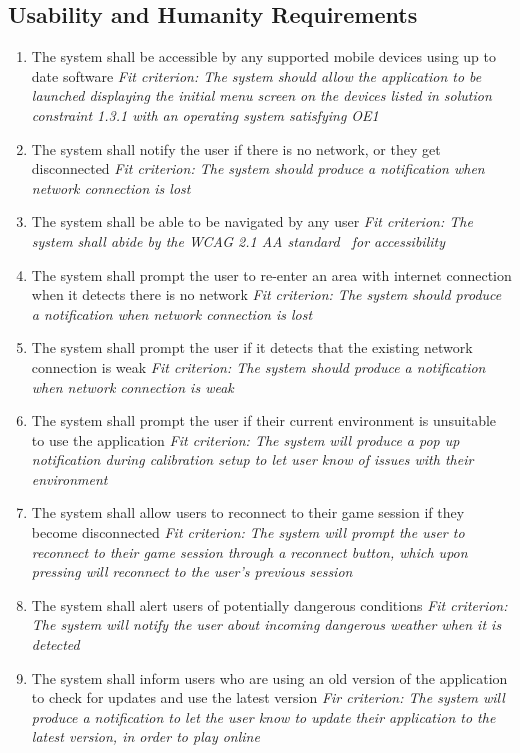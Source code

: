 \documentclass[12pt]{article}
\begin{document}
\subsection{Usability and Humanity Requirements}
\begin{enumerate}[UH\arabic*.]
	\item The system shall be accessible by any supported mobile devices using up to date software\newline
    \textit{Fit criterion: The system should allow the application to be launched displaying the initial menu screen on the devices listed in solution constraint 1.3.1 with an operating system satisfying OE1}
    \item The system shall notify the user if there is no network, or they get disconnected\newline
    \textit{Fit criterion: The system should produce a notification when network connection is lost}
    \item The system shall be able to be navigated by any user\newline
    \textit{Fit criterion: The system shall abide by the WCAG 2.1 AA standard~\citep{WCAG2.1}  for accessibility}
    \item The system shall prompt the user to re-enter an area with internet connection when it detects there is no network\newline
    \textit{Fit criterion: The system should produce a notification when network connection is lost}
    \item The system shall prompt the user if it detects that the existing network connection is weak\newline
    \textit{Fit criterion: The system should produce a notification when network connection is weak}
    \item The system shall prompt the user if their current environment is unsuitable to use the application\newline
    \textit{Fit criterion: The system will produce a pop up notification during calibration setup to let user know of issues with their environment}
    \item The system shall allow users to reconnect to their game session if they become disconnected\newline
    \textit{Fit criterion: The system will prompt the user to reconnect to their game session through a reconnect button, which upon pressing will reconnect to the user's previous session}
    \item The system shall alert users of potentially dangerous conditions \newline
    \textit{Fit criterion: The system will notify the user about incoming dangerous weather when it is detected}
    \item The system shall inform users who are using an old version of the application to check for updates and use the latest version
    \newline
    \textit{Fir criterion: The system will produce a notification to let the user know to update their application to the latest version, in order to play online}
\end{enumerate}
\end{document}
